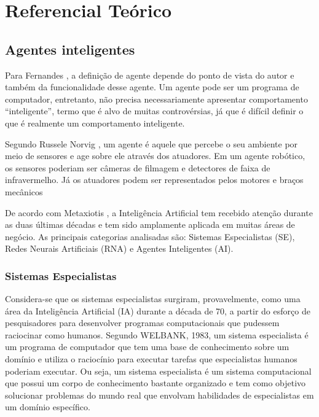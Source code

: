 

\chapter{Referencial Teórico}\label{referencial_teorico}

\section{Agentes inteligentes}

Para Fernandes \cite{fernandes2003agentes}, a definição de agente depende do ponto de vista do autor e também da funcionalidade desse agente. Um agente pode ser um programa de computador, entretanto, não precisa necessariamente apresentar comportamento “inteligente”, termo que é alvo de muitas controvérsias, já que é difícil definir o que é realmente um comportamento inteligente.  

Segundo Russele Norvig \cite{russell2016artificial}, um agente é aquele que percebe o seu ambiente por meio de sensores e age sobre ele através dos atuadores. Em um agente robótico, os sensores poderiam ser câmeras de filmagem e detectores de faixa de infravermelho. Já os atuadores podem ser representados pelos motores e braços mecânicos 

De acordo com Metaxiotis \cite{metaxiotis2004decision}, a Inteligência Artificial tem recebido atenção durante as duas últimas décadas e tem sido amplamente aplicada em muitas áreas de negócio. As principais categorias analisadas são: Sistemas Especialistas (SE), Redes Neurais Artificiais (RNA) e Agentes Inteligentes (AI). 

\subsection{Sistemas Especialistas}
Considera-se que os sistemas especialistas surgiram, provavelmente, como uma área da Inteligência Artificial (IA) durante a década de 70, a partir do esforço de pesquisadores para desenvolver programas computacionais que pudessem raciocinar como humanos. Segundo WELBANK, 1983, um sistema especialista é um programa de computador que tem uma base de conhecimento sobre um domínio e utiliza o raciocínio para executar tarefas que especialistas humanos poderiam executar. Ou seja, um sistema especialista é um sistema computacional que possui um corpo de conhecimento bastante organizado e tem como objetivo solucionar problemas do mundo real que envolvam habilidades de especialistas em um domínio específico. 

